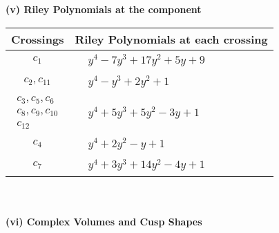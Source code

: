 \documentclass[1p]{elsarticle_modified}
\theoremstyle{definition}
\begin{document}
\newpage\renewcommand{\arraystretch}{1}
\flushleft \textbf{(v) Riley Polynomials at the component}\newline \\
\begin{tabular}{m{50pt}|m{274pt}}
Crossings & \hspace{64pt}Riley Polynomials at each crossing \\
\hline $$\begin{aligned}c_{1}\end{aligned}$$&$\begin{aligned}
&y^4-7 y^3+17 y^2+5 y+9
\end{aligned}$\\
\hline $$\begin{aligned}c_{2},c_{11}\end{aligned}$$&$\begin{aligned}
&y^4- y^3+2 y^2+1
\end{aligned}$\\
\hline $$\begin{aligned}c_{3},c_{5},c_{6}\\c_{8},c_{9},c_{10}\\c_{12}\end{aligned}$$&$\begin{aligned}
&y^4+5 y^3+5 y^2-3 y+1
\end{aligned}$\\
\hline $$\begin{aligned}c_{4}\end{aligned}$$&$\begin{aligned}
&y^4+2 y^2- y+1
\end{aligned}$\\
\hline $$\begin{aligned}c_{7}\end{aligned}$$&$\begin{aligned}
&y^4+3 y^3+14 y^2-4 y+1
\end{aligned}$\\
\hline
\end{tabular}\\~\\
\newpage\flushleft \textbf{(vi) Complex Volumes and Cusp Shapes}
\end{document}
